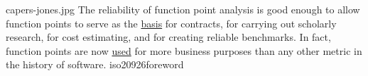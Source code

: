 \documentclass{article}
\begin{document}

\qte
  {capers-jones.jpg}
  {The reliability of function point analysis is good enough to allow function points to serve as the \ul{basis} for contracts, for carrying out scholarly research, for cost estimating, and for creating reliable benchmarks. In fact, function points are now \ul{used} for more business purposes than any other metric in the history of software.}
  {iso20926foreword}

\end{document}
